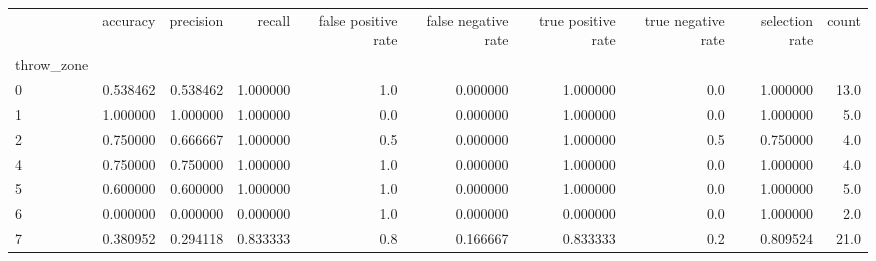 \begin{tabular}{lrrrrrrrrr}
\toprule
{} &  accuracy &  precision &    recall &  false positive rate &  false negative rate &  true positive rate &  true negative rate &  selection rate &  count \\
throw\_zone &           &            &           &                      &                      &                     &                     &                 &        \\
\midrule
0          &  0.538462 &   0.538462 &  1.000000 &                  1.0 &             0.000000 &            1.000000 &                 0.0 &        1.000000 &   13.0 \\
1          &  1.000000 &   1.000000 &  1.000000 &                  0.0 &             0.000000 &            1.000000 &                 0.0 &        1.000000 &    5.0 \\
2          &  0.750000 &   0.666667 &  1.000000 &                  0.5 &             0.000000 &            1.000000 &                 0.5 &        0.750000 &    4.0 \\
4          &  0.750000 &   0.750000 &  1.000000 &                  1.0 &             0.000000 &            1.000000 &                 0.0 &        1.000000 &    4.0 \\
5          &  0.600000 &   0.600000 &  1.000000 &                  1.0 &             0.000000 &            1.000000 &                 0.0 &        1.000000 &    5.0 \\
6          &  0.000000 &   0.000000 &  0.000000 &                  1.0 &             0.000000 &            0.000000 &                 0.0 &        1.000000 &    2.0 \\
7          &  0.380952 &   0.294118 &  0.833333 &                  0.8 &             0.166667 &            0.833333 &                 0.2 &        0.809524 &   21.0 \\
\bottomrule
\end{tabular}
